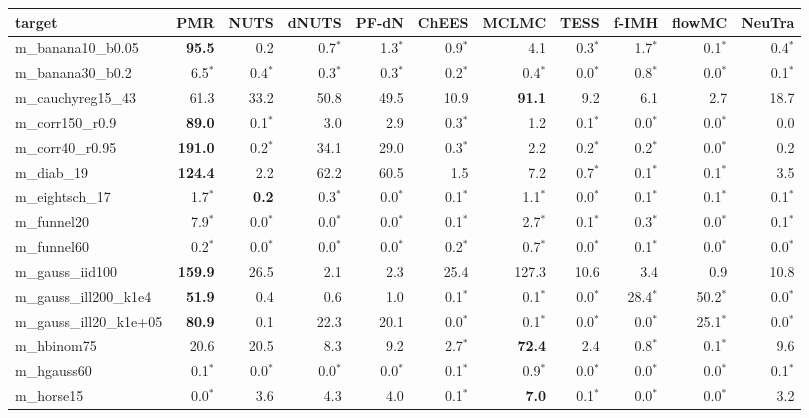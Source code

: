 \begin{tabular}{lrrrrrrrrrr}
\toprule
target & PMR & NUTS & dNUTS & PF-dN & ChEES & MCLMC & TESS & f-IMH & flowMC & NeuTra \\
\midrule
m\_banana10\_b0.05 & \textbf{95.5} & 0.2 & 0.7$^{*}$ & 1.3$^{*}$ & 0.9$^{*}$ & 4.1 & 0.3$^{*}$ & 1.7$^{*}$ & 0.1$^{*}$ & 0.4$^{*}$ \\
m\_banana30\_b0.2 & 6.5$^{*}$ & 0.4$^{*}$ & 0.3$^{*}$ & 0.3$^{*}$ & 0.2$^{*}$ & 0.4$^{*}$ & 0.0$^{*}$ & 0.8$^{*}$ & 0.0$^{*}$ & 0.1$^{*}$ \\
m\_cauchyreg15\_43 & 61.3 & 33.2 & 50.8 & 49.5 & 10.9 & \textbf{91.1} & 9.2 & 6.1 & 2.7 & 18.7 \\
m\_corr150\_r0.9 & \textbf{89.0} & 0.1$^{*}$ & 3.0 & 2.9 & 0.3$^{*}$ & 1.2 & 0.1$^{*}$ & 0.0$^{*}$ & 0.0$^{*}$ & 0.0 \\
m\_corr40\_r0.95 & \textbf{191.0} & 0.2$^{*}$ & 34.1 & 29.0 & 0.3$^{*}$ & 2.2 & 0.2$^{*}$ & 0.2$^{*}$ & 0.0$^{*}$ & 0.2 \\
m\_diab\_19 & \textbf{124.4} & 2.2 & 62.2 & 60.5 & 1.5 & 7.2 & 0.7$^{*}$ & 0.1$^{*}$ & 0.1$^{*}$ & 3.5 \\
m\_eightsch\_17 & 1.7$^{*}$ & \textbf{0.2} & 0.3$^{*}$ & 0.0$^{*}$ & 0.1$^{*}$ & 1.1$^{*}$ & 0.0$^{*}$ & 0.1$^{*}$ & 0.1$^{*}$ & 0.1$^{*}$ \\
m\_funnel20 & 7.9$^{*}$ & 0.0$^{*}$ & 0.0$^{*}$ & 0.0$^{*}$ & 0.1$^{*}$ & 2.7$^{*}$ & 0.1$^{*}$ & 0.3$^{*}$ & 0.0$^{*}$ & 0.1$^{*}$ \\
m\_funnel60 & 0.2$^{*}$ & 0.0$^{*}$ & 0.0$^{*}$ & 0.0$^{*}$ & 0.2$^{*}$ & 0.7$^{*}$ & 0.0$^{*}$ & 0.1$^{*}$ & 0.0$^{*}$ & 0.0$^{*}$ \\
m\_gauss\_iid100 & \textbf{159.9} & 26.5 & 2.1 & 2.3 & 25.4 & 127.3 & 10.6 & 3.4 & 0.9 & 10.8 \\
m\_gauss\_ill200\_k1e4 & \textbf{51.9} & 0.4 & 0.6 & 1.0 & 0.1$^{*}$ & 0.1$^{*}$ & 0.0$^{*}$ & 28.4$^{*}$ & 50.2$^{*}$ & 0.0$^{*}$ \\
m\_gauss\_ill20\_k1e+05 & \textbf{80.9} & 0.1 & 22.3 & 20.1 & 0.0$^{*}$ & 0.1$^{*}$ & 0.0$^{*}$ & 0.0$^{*}$ & 25.1$^{*}$ & 0.0$^{*}$ \\
m\_hbinom75 & 20.6 & 20.5 & 8.3 & 9.2 & 2.7$^{*}$ & \textbf{72.4} & 2.4 & 0.8$^{*}$ & 0.1$^{*}$ & 9.6 \\
m\_hgauss60 & 0.1$^{*}$ & 0.0$^{*}$ & 0.0$^{*}$ & 0.0$^{*}$ & 0.1$^{*}$ & 0.9$^{*}$ & 0.0$^{*}$ & 0.0$^{*}$ & 0.0$^{*}$ & 0.1$^{*}$ \\
m\_horse15 & 0.0$^{*}$ & 3.6 & 4.3 & 4.0 & 0.1$^{*}$ & \textbf{7.0} & 0.1$^{*}$ & 0.0$^{*}$ & 0.0$^{*}$ & 3.2 \\

\end{tabular}
